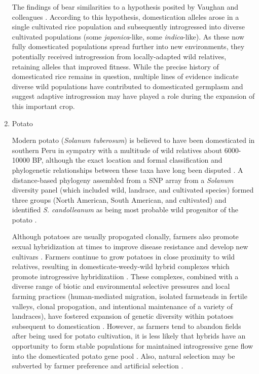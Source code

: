 \documentclass[11pt]{article}
\begin{document}
\begin{enumerate}
The findings of \cite{choi2018multiple} bear similarities to a hypothesis posited by Vaughan and colleagues \cite{vaughan2008evolving}.
According to this hypothesis, domestication alleles arose in a single cultivated rice population and subsequently introgressed into diverse cultivated populations (some \emph{japonica}-like, some \emph{indica}-like).
As these now fully domesticated populations spread further into new environments, they potentially received introgression from locally-adapted wild relatives, retaining alleles that improved fitness.
While the precise history of domesticated rice remains in question, multiple lines of evidence indicate diverse wild populations have contributed to domesticated germplasm and suggest adaptive introgression may have played a role during the expansion of this important crop.


\item{Potato}

Modern potato (\emph{Solanum tuberosum}) is believed to have been domesticated in southern Peru in sympatry with a multitude of wild relatives about 6000-10000 BP, although the exact location and formal classification and phylogenetic relationships between these taxa have long been disputed \cite{huaman2002reclassification, spooner2005single, pickersgill1977origins, hawkes1988evolution}.
A distance-based phylogeny assembled from a SNP array from a \emph{Solanum} diversity panel (which included wild, landrace, and cultivated species) formed three groups (North American, South American, and cultivated) and identified \emph{S. candolleanum} as being most probable wild progenitor of the potato \cite{hardigan2015taxonomy}.

Although potatoes are usually propogated clonally, farmers also promote sexual hybridization at times to improve disease resistance and develop new cultivars \cite{quiros1992increase}.
Farmers continue to grow potatoes in close proximity to wild relatives, resulting in domesticate-weedy-wild hybrid complexes which promote introgressive hybridizatiion \cite{rabinowitz1990high, johns1987relationships, linder1987diversity}.
These complexes, combined with a diverse range of biotic and environmental selective pressures and local farming practices (human-mediated migration, isolated farmsteads in fertile valleys, clonal propogation, and intentional maintenance of a variety of landraces), have fostered expansion of genetic diversity within potatoes subsequent to domestication \cite{brush1995potato}.
However, as farmers tend to abandon fields after being used for potato cultivation, it is less likely that hybrids have an opportunity to form stable populations for maintained introgressive gene flow into the domesticated potato gene pool \cite{brush1995potato}.
Also, natural selection may be subverted by farmer preference and artificial selection \cite{brush1981dynamics}.


\end{enumerate}
\end{document}
